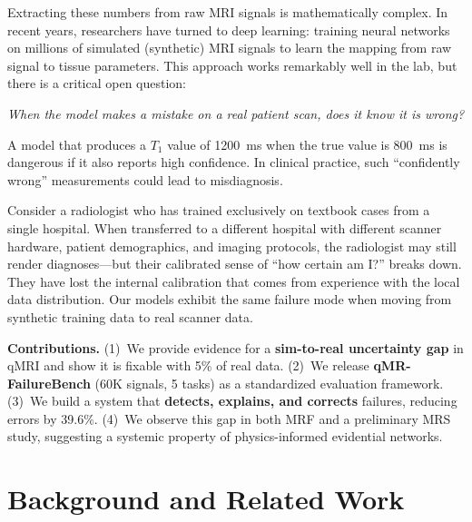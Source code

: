 \documentclass[11pt,a4paper]{article}
\begin{document}
Extracting these numbers from raw MRI signals is mathematically complex. In recent years, researchers have turned to deep learning: training neural networks on millions of simulated (synthetic) MRI signals to learn the mapping from raw signal to tissue parameters. This approach works remarkably well in the lab, but there is a critical open question:

\begin{center}
\textit{When the model makes a mistake on a real patient scan, does it know it is wrong?}
\end{center}

A model that produces a $T_1$ value of 1200~ms when the true value is 800~ms is dangerous if it also reports high confidence. In clinical practice, such ``confidently wrong'' measurements could lead to misdiagnosis.

\begin{intuition}
Consider a radiologist who has trained exclusively on textbook cases from a single hospital. When transferred to a different hospital with different scanner hardware, patient demographics, and imaging protocols, the radiologist may still render diagnoses---but their calibrated sense of ``how certain am I?'' breaks down. They have lost the internal calibration that comes from experience with the local data distribution. Our models exhibit the same failure mode when moving from synthetic training data to real scanner data.
\end{intuition}

\textbf{Contributions.}
(1)~We provide evidence for a \textbf{sim-to-real uncertainty gap} in qMRI and show it is fixable with 5\% of real data.
(2)~We release \textbf{qMR-FailureBench} (60K signals, 5 tasks) as a standardized evaluation framework.
(3)~We build a system that \textbf{detects, explains, and corrects} failures, reducing errors by 39.6\%.
(4)~We observe this gap in both MRF and a preliminary MRS study, suggesting a systemic property of physics-informed evidential networks.

\section{Background and Related Work}
\label{sec:related}
\end{document}
